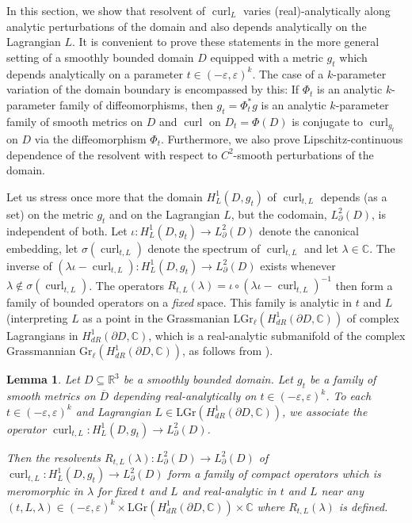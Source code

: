 \documentclass[11pt,reqno]{amsart}
\newtheorem{lemma}{Lemma}[section]
\DeclareMathOperator{\curl}{curl}
\begin{document}
In this section, we show that resolvent of $\curl_L$ varies (real)-analytically along analytic perturbations of the domain and also depends analytically on the Lagrangian $L$. It is convenient to prove these statements in the more general setting of a smoothly bounded domain $D$ equipped with a metric $g_t$ which depends analytically on a parameter $t \in (-\varepsilon,\varepsilon)^k$. The case of a $k$-parameter variation of the domain boundary is encompassed by this: If $\Phi_t$ is an analytic $k$-parameter family of diffeomorphisms, then $g_t = \Phi_t^\ast g$ is an analytic $k$-parameter family of smooth metrics on $D$ and $\curl$ on $D_t = \Phi(D)$ is conjugate to $\curl_{g_t}$ on $D$ via the diffeomorphism $\Phi_t$. Furthermore, we also prove Lipschitz-continuous dependence of the resolvent with respect to $C^2$-smooth perturbations of the domain. 

Let us stress once more that the domain $H^1_{L}(D,g_t)$ of $\curl_{t,L}$ depends (as a set) on the metric $g_t$ and on the Lagrangian $L$, but the codomain, $L^2_{\partial}(D)$, is independent of both. Let $\iota: H^1_{L}(D,g_t) \to L^2_{\partial}(D)$ denote the canonical embedding, let $\sigma (\curl_{t,L})$ denote the spectrum of $\curl_{t,L}$ and let $\lambda \in \mathbb C$. The inverse of $(\lambda \iota - \curl_{t,L}): H^1_{L}(D,g_t) \to L^2_{\partial}(D)$ exists whenever $\lambda \not\in \sigma(\curl_{t,L})$. The operators $R_{t,L}(\lambda) = \iota \circ (\lambda \iota - \curl_{t,L})^{-1}$ then form a family of bounded operators on a \emph{fixed} space. This family is analytic in $t$ and $L$ (interpreting $L$ as a point in the Grassmanian $\mathrm{LGr}_\ell(H^1_{dR}(\partial D,\mathbb C))$ of complex Lagrangians in $H^1_{dR}(\partial D,\mathbb C)$, which is a real-analytic submanifold of the complex Grassmannian $\mathrm{Gr}_\ell(H^1_{dR}(\partial D,\mathbb C))$, as follows from \cite[Theorem 3]{EverittMarkus1999}).

\begin{lemma}
    \label{lem:analytic_resolvent}
    Let $D \subseteq \mathbb R^3$ be a smoothly bounded domain. Let $g_t$ be a family of smooth metrics on $\overline{D}$ depending real-analytically on $t \in (-\varepsilon,\varepsilon)^k$. To each $t \in (-\varepsilon,\varepsilon)^k$ and Lagrangian $L \in \mathrm{LGr}(H^1_{dR}(\partial D,\mathbb C))$, we associate the operator $\curl_{t,L}: H^1_{L}(D,g_t) \to L^2_\partial(D)$.
    
    Then the resolvents $R_{t,L}(\lambda): L^2_\partial(D) \to L^2_\partial(D)$ of $\curl_{t,L}: H^1_{L}(D,g_t) \to L^2_\partial(D)$ form a family of compact operators which is meromorphic in $\lambda$ for fixed $t$ and $L$ and real-analytic in $t$ and $L$ near any $(t,L,\lambda) \in (-\varepsilon,\varepsilon)^k \times \mathrm{LGr}(H^1_{dR}(\partial D,\mathbb C)) \times \mathbb C$ where $R_{t,L}(\lambda)$ is defined.
\end{lemma}
\end{document}
